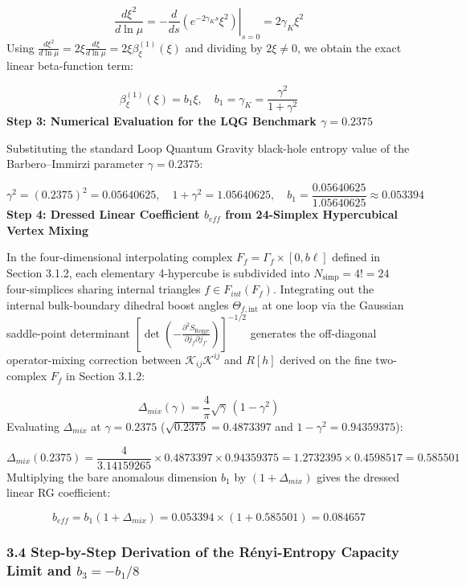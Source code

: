 \documentclass[aps,prd,onecolumn,superscriptaddress,nofootinbib,longbibliography,10pt]{revtex4-2}
\begin{document}
  \[ \frac{d\xi^2}{d\ln\mu} = -\left.\frac{d}{ds}\left(e^{-2\gamma_K s}\xi^2\right)\right|_{s=0} = 2\gamma_K\xi^2 \]
  Using \(\frac{d\xi^2}{d\ln\mu} = 2\xi\frac{d\xi}{d\ln\mu} = 2\xi\beta_\xi^{(1)}(\xi)\) and dividing by \(2\xi \neq 0\), we obtain the exact linear beta-function term:


  \[ \beta_\xi^{(1)}(\xi) = b_1\xi, \quad b_1 = \gamma_K = \frac{\gamma^2}{1 + \gamma^2} \]
  \textbf{Step 3: Numerical Evaluation for the LQG Benchmark \(\gamma = 0.2375\)}


  Substituting the standard Loop Quantum Gravity black-hole entropy value of the Barbero–Immirzi parameter \(\gamma = 0.2375\):


  \[ \gamma^2 = (0.2375)^2 = 0.05640625, \quad 1 + \gamma^2 = 1.05640625, \quad b_1 = \frac{0.05640625}{1.05640625} \approx 0.053394 \]
  \textbf{Step 4: Dressed Linear Coefficient \(b_{eff}\) from 24-Simplex Hypercubical Vertex Mixing}


  In the four-dimensional interpolating complex \(F_f = \Gamma_f \times [0, b\ell]\) defined in Section 3.1.2, each elementary 4-hypercube is subdivided into \(N_{\text{simp}} = 4! = 24\) four-simplices sharing internal triangles \(f \in F_{int}(F_f)\). Integrating out the internal bulk-boundary dihedral boost angles \(\Theta_{f,\text{int}}\) at one loop via the Gaussian saddle-point determinant \(\left[\det\left(-\frac{\partial^2 S_{\text{Regge}}}{\partial j_f \partial j_{f'}}\right)\right]^{-1/2}\) generates the off-diagonal operator-mixing correction between \(\mathcal{K}_{ij}\mathcal{K}^{ij}\) and \(R[h]\) derived on the fine two-complex \(F_f\) in Section 3.1.2:


  \[ \Delta_{mix}(\gamma) = \frac{4}{\pi}\sqrt{\gamma}\,(1 - \gamma^2) \]
  Evaluating \(\Delta_{mix}\) at \(\gamma = 0.2375\) (\(\sqrt{0.2375} = 0.4873397\) and \(1 - \gamma^2 = 0.94359375\)):


  \[ \Delta_{mix}(0.2375) = \frac{4}{3.14159265} \times 0.4873397 \times 0.94359375 = 1.2732395 \times 0.4598517 = 0.585501 \]
  Multiplying the bare anomalous dimension \(b_1\) by \((1 + \Delta_{mix})\) gives the dressed linear RG coefficient:


  \[ b_{eff} = b_1(1 + \Delta_{mix}) = 0.053394 \times (1 + 0.585501) = 0.084657 \]
  
  
\subsubsection*{3.4 Step-by-Step Derivation of the Rényi-Entropy Capacity Limit and \(b_3 = -b_1/8\)}
\end{document}
